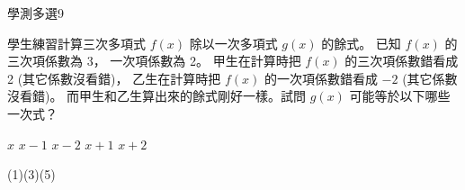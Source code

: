     \begin{QUESTION}
        \begin{ExamInfo}{95}{學測}{多選}{9}
        \end{ExamInfo}
        \begin{ExamAnsRateInfo}{38}{71}{30}{13}
        \end{ExamAnsRateInfo}
        \begin{QBODY}
            學生練習計算三次多項式 $f (x)$ 除以一次多項式 $g(x)$ 的餘式。
			已知 $f (x)$ 的三次項係數為 3， 一次項係數為 2。
			甲生在計算時把 $f(x)$ 的三次項係數錯看成 2 (其它係數沒看錯)，
			乙生在計算時把 $f (x)$ 的一次項係數錯看成 $-2$ (其它係數沒看錯)。
			而甲生和乙生算出來的餘式剛好一樣。試問 $g(x)$ 可能等於以下哪些一次式？

			\begin{QOPSINONELINE} 
				\QOP $x$    \QOP $x-1$    \QOP $x-2$    \QOP $x+1$    \QOP $x+2$
			\end{QOPSINONELINE}
        \end{QBODY}
        \begin{QFROMS}
        \end{QFROMS}
        \begin{QTAGS}\end{QTAGS}
        \begin{QANS}
            (1)(3)(5)
        \end{QANS}
        \begin{QSOLLIST}
        \end{QSOLLIST}
        \begin{QEMPTYSPACE}
        \end{QEMPTYSPACE}
    \end{QUESTION}
